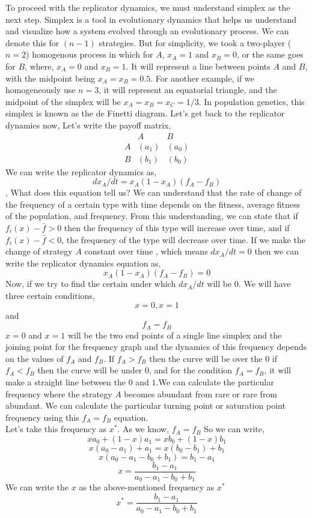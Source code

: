 \documentclass{article}
\begin{document}
To proceed with the replicator dynamics, we must understand simplex as the next step.
Simplex is a tool in evolutionary dynamics that helps us understand and visualize how a system evolved through an evolutionary process. We can denote this for $(n-1)$ strategies. But for simplicity, we took a two-player ($n=2$) homogenous process in which for $A$, $x_A=1$ and $x_B=0$, or the same goes for $B$, where, $x_A=0$ and $x_B=1$.
It will represent a line between points $A$ and $B$, with the midpoint being $x_A=x_B=0.5$. 
For another example, if we homogeneously use $ n=3$, it will represent an equatorial triangle, and the midpoint of the simplex will be $x_A=x_B=x_C=1/3$.
In population genetics, this simplex is known as the de Finetti diagram.
Let's get back to the replicator dynamics now, Let's write the payoff matrix,\\
\[
\begin{array}{c|cc}
    & A & B \\
    \hline
  A & (a_1) & (a_0) \\
  B & (b_1) & (b_0)
\end{array}
\]
We can write the replicator dynamics as,\\
\[dx_A/dt=x_A(1-x_A)(f_A-f_B)\],
What does this equation tell us? 
We can understand that the rate of change of the frequency of a certain type with time depends on the fitness, average fitness of the population, and frequency. From this understanding, we can state that if $f_i(x)-\bar{f}>0$ then the frequency of this type will increase over time, and if $f_i(x)-\bar{f}<0$, the frequency of the type will decrease over time.
If we make the change of strategy $A$ constant over time , which means $dx_A/dt=0$ then we can write the replicator dynamics equation as,
\[x_A(1-x_A)(f_A-f_B)=0\]
Now, if we try to find the certain under which $dx_A/dt$ will be $0$.
We will have three certain conditions,
\[x=0,x=1\] and \[f_A=f_B\]
$x=0$ and $x=1$ will be the two end points of a single line simplex and the joining point for the frequency graph and the dynamics of this frequency depends on the values of $f_A$ and $f_B$. If $f_A>f_B$ then the curve will be over the $0$ if $f_A<f_B$ then the curve will be under $0$, and for the condition $f_A=f_B$, it will make a straight line between the $0$ and $1$\cite{Bishop1976}.We can calculate the particular frequency where the strategy $A$ becomes abundant from rare or rare from abundant. We can calculate the particular turning point or saturation point frequency using this $f_A=f_B$ equation.\\
Let's take this frequency as $ x^*$.
As we know, $f_A=f_B$
So we can write,
\[xa_0+(1-x)a_1=xb_0+(1-x)b_1\]
\[x(a_0-a_1)+a_1=x(b_0-b_1)+b_1\]
\[x(a_0-a_1-b_0+b_1)=b_1-a_1\]
\[x=\frac{b_1-a_1}{a_0-a_1-b_0+b_1}\]
We can write the $x$ as the above-mentioned frequency as $x^*$
\[x^*=\frac{b_1-a_1}{a_0-a_1-b_0+b_1}\]
\end{document}
